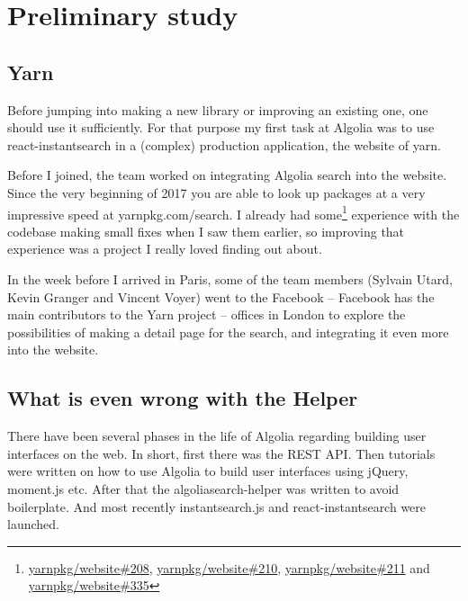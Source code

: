 
\section{Preliminary study} %
\subsection{Yarn} %
\label{sub:yarn}

Before jumping into making a new library or improving an existing one, one should use it sufficiently. For that purpose my first task at Algolia was to use react-instantsearch in a (complex) production application, the website of yarn\cite{yarn-site}.

Before I joined, the team worked on integrating Algolia search into the website\cite{yarn-pr-add-algolia}. Since the very beginning of 2017 you are able to look up packages at a very impressive speed at yarnpkg.com/search. I already had some\footnote{\href{https://github.com/yarnpkg/website/pulls/208}{yarnpkg/website\#208}, \href{https://github.com/yarnpkg/website/pulls/210}{yarnpkg/website\#210}, \href{https://github.com/yarnpkg/website/pulls211}{yarnpkg/website\#211} and \href{https://github.com/yarnpkg/website/pulls/335}{yarnpkg/website\#335}} experience with the codebase making small fixes when I saw them earlier, so improving that experience was a project I really loved finding out about.

In the week before I arrived in Paris, some of the team members (Sylvain Utard, Kevin Granger and Vincent Voyer) went to the Facebook -- Facebook has the main contributors to the Yarn project -- offices in London to explore the possibilities of making a detail page for the search, and integrating it even more into the website.

\subsection{What is even wrong with the Helper} %
\label{sub:what_is_even_wrong_with_the_helper}

There have been several phases in the life of Algolia regarding building user interfaces on the web. In short, first there was the REST API. Then tutorials were written on how to use Algolia to build user interfaces using jQuery, moment.js etc. After that the algoliasearch-helper\cite{algolia-helper-github} was written to avoid boilerplate. And most recently instantsearch.js\cite{instantsearch-js} and react-instantsearch\cite{react-instantsearch} were launched.

